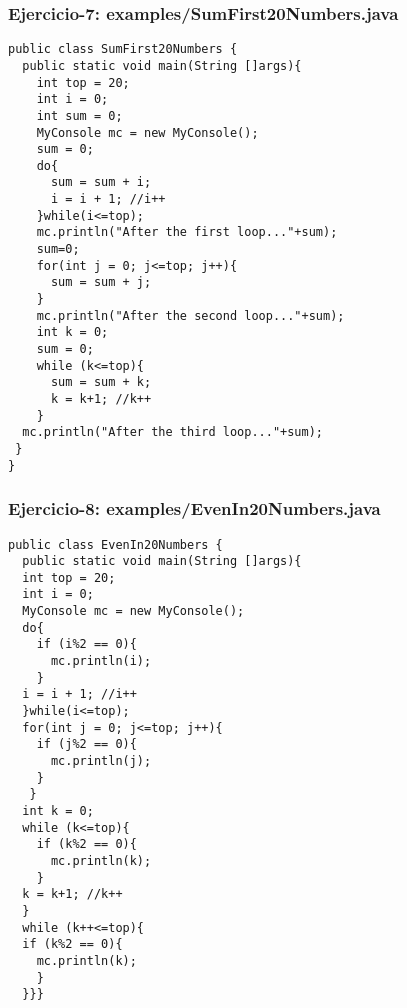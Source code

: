 \documentclass[xcolor=dvipsnames,dvip,notes=show,handout,table]{beamer}
\begin{document}


\begin{frame}[fragile]
\frametitle{Ejercicio-7: examples/SumFirst20Numbers.java}
\tiny
\begin{lstlisting}
public class SumFirst20Numbers {
  public static void main(String []args){
    int top = 20;
    int i = 0;
    int sum = 0;
    MyConsole mc = new MyConsole();
    sum = 0;
    do{
      sum = sum + i;
      i = i + 1; //i++
    }while(i<=top);		
    mc.println("After the first loop..."+sum);
    sum=0;
    for(int j = 0; j<=top; j++){
      sum = sum + j;
    }
    mc.println("After the second loop..."+sum);
    int k = 0;
    sum = 0;
    while (k<=top){
      sum = sum + k;
      k = k+1; //k++
    }
  mc.println("After the third loop..."+sum);
 }
}
\end{lstlisting}
\end{frame}




\begin{frame}[fragile]
\frametitle{Ejercicio-8: examples/EvenIn20Numbers.java}
\tiny
\begin{lstlisting}
public class EvenIn20Numbers {
  public static void main(String []args){
  int top = 20;
  int i = 0;
  MyConsole mc = new MyConsole();
  do{
    if (i%2 == 0){
      mc.println(i);
    }
  i = i + 1; //i++
  }while(i<=top);		
  for(int j = 0; j<=top; j++){
    if (j%2 == 0){
      mc.println(j);
    }
   }
  int k = 0;
  while (k<=top){
    if (k%2 == 0){
      mc.println(k);
    }
  k = k+1; //k++
  }
  while (k++<=top){
  if (k%2 == 0){
    mc.println(k);
    }
  }}}
\end{lstlisting}
\end{frame}
\end{document}
